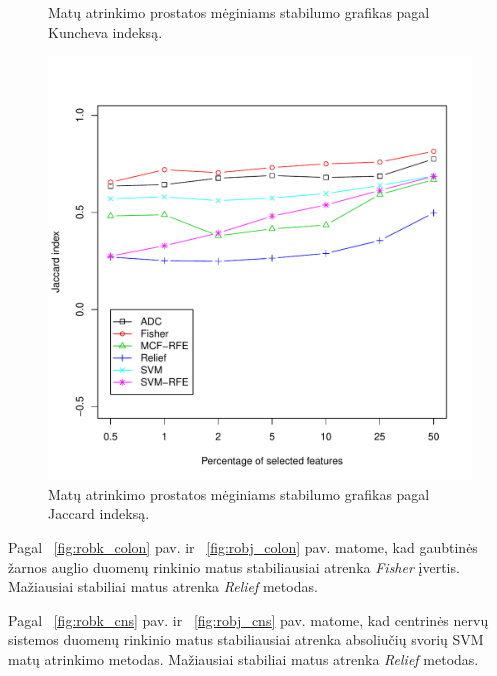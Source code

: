 \begin{figure}[H]
\begin{minipage}[b]{0.5\linewidth}
\caption{Matų atrinkimo prostatos mėginiams stabilumo grafikas pagal Kuncheva indeksą.}
\label{fig:robk_prostate}
\end{minipage}
\hspace{0.2cm}
\begin{minipage}[b]{0.5\linewidth}
\centering
\includegraphics[width=.85\textwidth]{../bachelor/images/prostate_robustness_jaccard.pdf}
\caption{Matų atrinkimo prostatos mėginiams stabilumo grafikas pagal Jaccard indeksą.}
\label{fig:robj_prostate}
\end{minipage}
\end{figure}
Pagal ~\ref{fig:robk_colon} pav. ir ~\ref{fig:robj_colon} pav. matome, kad gaubtinės žarnos auglio duomenų rinkinio matus stabiliausiai atrenka \textit{Fisher} įvertis. Mažiausiai stabiliai matus atrenka \textit{Relief} metodas.

Pagal ~\ref{fig:robk_cns} pav. ir ~\ref{fig:robj_cns} pav. matome, kad centrinės nervų sistemos duomenų rinkinio matus stabiliausiai atrenka absoliučių svorių SVM matų atrinkimo metodas. Mažiausiai stabiliai matus atrenka \textit{Relief} metodas.

